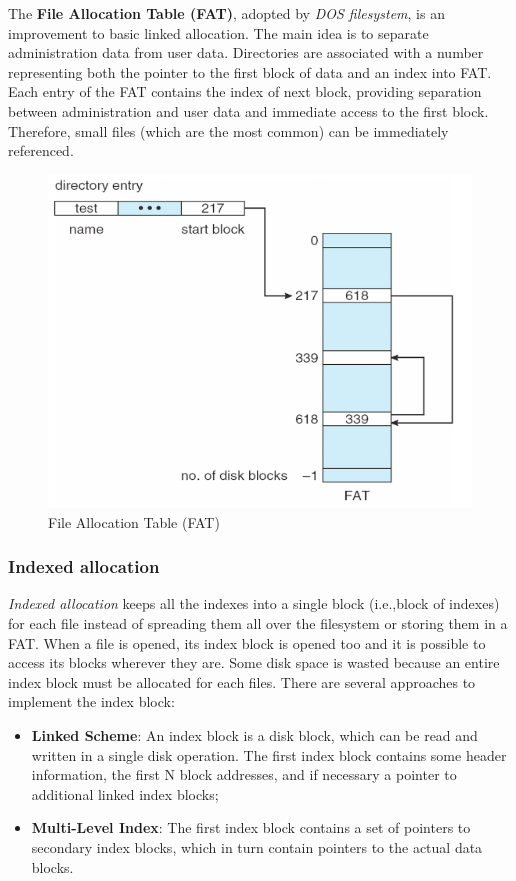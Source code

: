 The \textbf{File Allocation Table (FAT)}, adopted by \emph{DOS filesystem}, is an improvement to basic linked allocation. The main idea is to separate administration data from user data. Directories are associated with a number representing both the pointer to the first block of data and an index into FAT. Each entry of the FAT contains the index of next block, providing separation between administration and user data and immediate access to the first block. Therefore, small files (which are the most common) can be immediately referenced.

\begin{figure}[hbtp]
\centering
\includegraphics[scale=0.35]{images/file_system/fat.png}
\caption{File Allocation Table (FAT)}
\end{figure}

\subsubsection{Indexed allocation}
\emph{Indexed allocation} keeps all the indexes into a single block (i.e.,\@ block of indexes) for each file instead of spreading them all over the filesystem or storing them in a FAT. When a file is opened, its index block is opened too and it is possible to access its blocks wherever they are. Some disk space is wasted because an entire index block must be allocated for each files. There are several approaches to implement the index block:
\begin{itemize}
\item \textbf{Linked Scheme}: An index block is a disk block, which can be read and written in a single disk operation. The first index block contains some header information, the first N block addresses, and if necessary a pointer to additional linked index blocks;
\item \textbf{Multi-Level Index}: The first index block contains a set of pointers to secondary index blocks, which in turn contain pointers to the actual data blocks.
\end{itemize}

